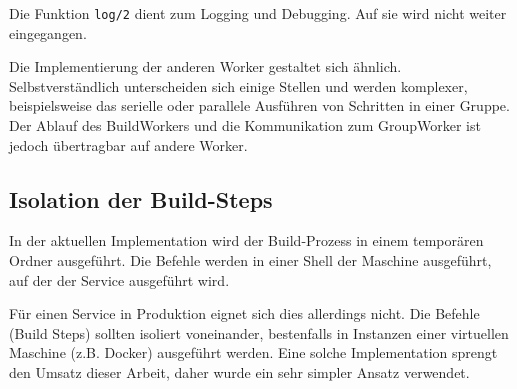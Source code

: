 Die Funktion \texttt{log/2} dient zum Logging und Debugging. Auf sie wird nicht weiter eingegangen.

Die Implementierung der anderen Worker gestaltet sich ähnlich. Selbstverständlich unterscheiden sich einige Stellen und werden komplexer, beispielsweise das serielle oder parallele Ausführen von Schritten in einer Gruppe. Der Ablauf des BuildWorkers und die Kommunikation zum GroupWorker ist jedoch übertragbar auf andere Worker.

\subsection{Isolation der Build-Steps}

In der aktuellen Implementation wird der Build-Prozess in einem temporären Ordner ausgeführt. Die Befehle werden in einer Shell der Maschine ausgeführt, auf der der Service ausgeführt wird.

Für einen Service in Produktion eignet sich dies allerdings nicht. Die Befehle (Build Steps) sollten isoliert voneinander, bestenfalls in Instanzen einer virtuellen Maschine (z.B. Docker) ausgeführt werden. Eine solche Implementation sprengt den Umsatz dieser Arbeit, daher wurde ein sehr simpler Ansatz verwendet.
